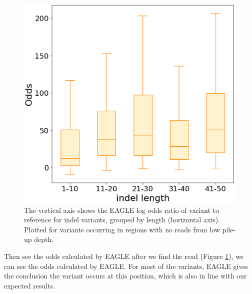 \vspace{0.5cm}
\begin{figure}[H]
    \centering
    \includegraphics[width=0.6\columnwidth]{body/image/low_new_odds.png}
    \captionsetup{labelfont=bf}
    \renewcommand{\baselinestretch}{1.0}
    \caption[no reads with variants from low pile-up depth odds ratio]{The vertical axis shows the EAGLE log odds ratio of variant to reference for indel variants, grouped by length (horizontal axis).  Plotted for variants occurring in regions with no reads from low pile-up depth.}
    \label{low_new_odds}
\end{figure}

Then see the odds calculated by EAGLE after we find the read (Figure \ref{low_new_odds}), we can see the odds calculated by EAGLE. For most of the variants, EAGLE gives the conclusion the variant occurs at this position, which is also in line with our expected results.


